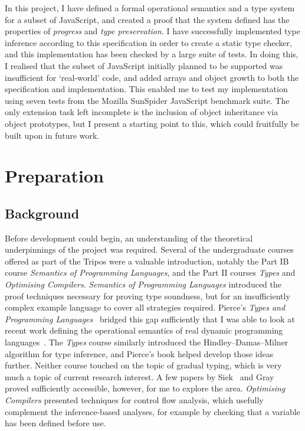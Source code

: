 \documentclass[12pt,a4paper,twoside,openright]{report}
\begin{document}
In this project, I have defined a formal operational semantics and a type
system for a subset of JavaScript, and created a proof that the system defined
has the properties of \textit{progress} and \textit{type preservation}. I have
successfully implemented type inference according to this specification in
order to create a static type checker, and this implementation has been checked
by a large suite of tests. In doing this, I realised that the subset of
JavaScript initially planned to be supported was insufficient for `real-world'
code, and added arrays and object growth to both the specification and
implementation. This enabled me to test my implementation using seven tests
from the Mozilla SunSpider JavaScript benchmark suite. The only extension task
left incomplete is the inclusion of object inheritance via object prototypes,
but I present a starting point to this, which could fruitfully be built upon in
future work.

\chapter{Preparation}\label{preparation} \section{Background}

Before development could begin, an understanding of the theoretical
underpinnings of the project was required. Several of the undergraduate courses
offered as part of the Tripos were a valuable introduction, notably the Part IB
course \textit{Semantics of Programming Languages}, and the Part II courses
\textit{Types} and \textit{Optimising Compilers}. \textit{Semantics of
Programming Languages} introduced the proof techniques necessary for proving
type soundness, but for an insufficiently complex example language to cover all
strategies required. Pierce's \textit{Types and Programming
Languages}~\cite{pierce} bridged this gap sufficiently that I was able to look
at recent work defining the operational semantics of real dynamic programming
languages~\cite{pythonOpSem}. The \textit{Types} course similarly introduced
the Hindley--Damas--Milner algorithm for type inference, and Pierce's book
helped develop those ideas further. Neither course touched on the topic of
gradual typing, which is very much a topic of current research interest. A few
papers by Siek~\cite{gradSiek, gradSiek2} and Gray~\cite{gradGray} proved
sufficiently accessible, however, for me to explore the area.
\textit{Optimising Compilers} presented techniques for control flow analysis,
which usefully complement the inference-based analyses, for example by checking
that a variable has been defined before use.
\end{document}
